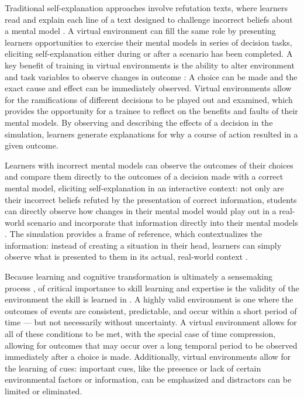 Traditional self-explanation approaches involve refutation texts, where learners read and explain each line of a text designed to challenge incorrect beliefs about a mental model \citep{Chi1994}. A virtual environment can fill the same role by presenting learners opportunities to exercise their mental models in series of decision tasks, eliciting self-explanation either during or after a scenario has been completed. A key benefit of training in virtual environments is the ability to alter environment and task variables to observe changes in outcome \citep{Klein2006}: A choice can be made and the exact cause and effect can be immediately observed. Virtual environments allow for the ramifications of different decisions to be played out and examined, which provides the opportunity for a trainee to reflect on the benefits and faults of their mental models. By observing and describing the effects of a decision in the simulation, learners generate explanations for why a course of action resulted in a given outcome.

Learners with incorrect mental models can observe the outcomes of their choices and compare them directly to the outcomes of a decision made with a correct mental model, eliciting self-explanation in an interactive context: not only are their incorrect beliefs refuted by the presentation of correct information, students can directly observe how changes in their mental model would play out in a real-world scenario and incorporate that information directly into their mental models \citep{Salzman1999}. The simulation provides a frame of reference, which contextualizes the information: instead of creating a situation in their head, learners can simply observe what is presented to them in its actual, real-world context \citep{Ericsson1993}.

Because learning and cognitive transformation is ultimately a sensemaking process \citep{Klein2006}, of critical importance to skill learning and expertise is the validity of the environment the skill is learned in \citep{Kahneman2009}. A highly valid environment is one where the outcomes of events are consistent, predictable, and occur within a short period of time — but not necessarily without uncertainty. A virtual environment allows for all of these conditions to be met, with the special case of time compression, allowing for outcomes that may occur over a long temporal period to be observed immediately after a choice is made. Additionally, virtual environments allow for the learning of cues: important cues, like the presence or lack of certain environmental factors or information, can be emphasized and distractors can be limited or eliminated.

